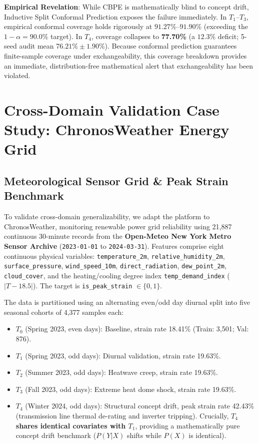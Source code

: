 \documentclass[conference]{IEEEtran}
\begin{document}
\textbf{Empirical Revelation}: While CBPE is mathematically blind to concept drift, Inductive Split Conformal Prediction exposes the failure immediately. In $T_1$--$T_3$, empirical conformal coverage holds rigorously at $91.27\%\text{--}91.90\%$ (exceeding the $1-\alpha = 90.0\%$ target). In $T_4$, coverage collapses to \textbf{77.70\%} (a $12.3\%$ deficit; 5-seed audit mean $76.21\% \pm 1.90\%$). Because conformal prediction guarantees finite-sample coverage under exchangeability, this coverage breakdown provides an immediate, distribution-free mathematical alert that exchangeability has been violated.

\section{Cross-Domain Validation Case Study: ChronosWeather Energy Grid}

\subsection{Meteorological Sensor Grid \& Peak Strain Benchmark}
To validate cross-domain generalizability, we adapt the platform to ChronosWeather, monitoring renewable power grid reliability using 21,887 continuous 30-minute records from the \textbf{Open-Meteo New York Metro Sensor Archive} (\texttt{2023-01-01} to \texttt{2024-03-31}). Features comprise eight continuous physical variables: \texttt{temperature\_2m}, \texttt{relative\_humidity\_2m}, \texttt{surface\_pressure}, \texttt{wind\_speed\_10m}, \texttt{direct\_radiation}, \texttt{dew\_point\_2m}, \texttt{cloud\_cover}, and the heating/cooling degree index \texttt{temp\_demand\_index} ($|T - 18.5|$). The target is \texttt{is\_peak\_strain} $\in \{0, 1\}$.

The data is partitioned using an alternating even/odd day diurnal split into five seasonal cohorts of 4,377 samples each:
\begin{itemize}
    \item $T_0$ (Spring 2023, even days): Baseline, strain rate 18.41\% (Train: 3,501; Val: 876).
    \item $T_1$ (Spring 2023, odd days): Diurnal validation, strain rate 19.63\%.
    \item $T_2$ (Summer 2023, odd days): Heatwave creep, strain rate 19.63\%.
    \item $T_3$ (Fall 2023, odd days): Extreme heat dome shock, strain rate 19.63\%.
    \item $T_4$ (Winter 2024, odd days): Structural concept drift, peak strain rate 42.43\% (transmission line thermal de-rating and inverter tripping). Crucially, \textbf{$T_4$ shares identical covariates with $T_1$}, providing a mathematically pure concept drift benchmark ($P(Y|X)$ shifts while $P(X)$ is identical).
\end{itemize}
\end{document}
